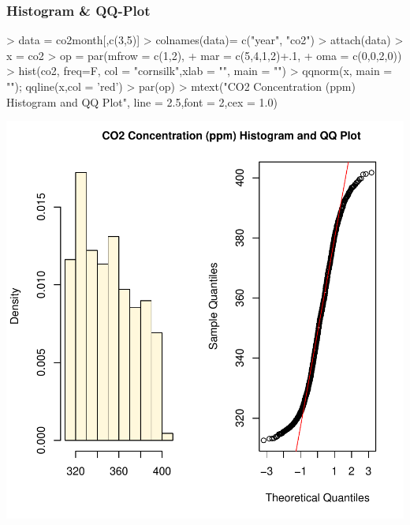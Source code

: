 \documentclass[11pt, a4paper]{article} %
\begin{document}
\subsubsection{Histogram \& QQ-Plot}
\begin{Schunk}
\begin{Sinput}
> data = co2month[,c(3,5)]
> colnames(data)= c("year", "co2")
> attach(data)
> x = co2
> op = par(mfrow = c(1,2),
+           mar = c(5,4,1,2)+.1,
+           oma = c(0,0,2,0))
> hist(co2, freq=F, col = "cornsilk",xlab = "", main = "")
> qqnorm(x, main = ""); qqline(x,col = 'red')
> par(op)
> mtext("CO2 Concentration (ppm) Histogram and QQ Plot", line = 2.5,font = 2,cex = 1.0)
\end{Sinput}
\end{Schunk}
\includegraphics{sweaveclean-fig1check}
\end{document}
